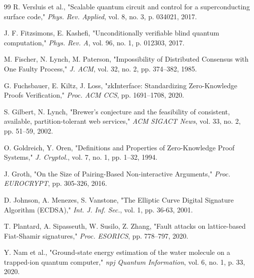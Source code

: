 \documentclass[preprint,12pt]{elsarticle}
\begin{document}
\begin{thebibliography}{99}
                R. Versluis et al., 
                "Scalable quantum circuit and control for a superconducting surface code," 
                \textit{Phys. Rev. Applied}, vol. 8, no. 3, p. 034021, 2017.

                J. F. Fitzsimons, E. Kashefi, 
                "Unconditionally verifiable blind quantum computation," 
                \textit{Phys. Rev. A}, vol. 96, no. 1, p. 012303, 2017.

                M. Fischer, N. Lynch, M. Paterson, 
                "Impossibility of Distributed Consensus with One Faulty Process," 
                \textit{J. ACM}, vol. 32, no. 2, pp. 374–382, 1985.

                G. Fuchsbauer, E. Kiltz, J. Loss, 
                "zkInterface: Standardizing Zero-Knowledge Proofs Verification," 
                \textit{Proc. ACM CCS}, pp. 1691–1708, 2020.

                S. Gilbert, N. Lynch, 
                "Brewer's conjecture and the feasibility of consistent, available, partition-tolerant web services," 
                \textit{ACM SIGACT News}, vol. 33, no. 2, pp. 51–59, 2002.

                O. Goldreich, Y. Oren, 
                "Definitions and Properties of Zero-Knowledge Proof Systems," 
                \textit{J. Cryptol.}, vol. 7, no. 1, pp. 1–32, 1994.

                J. Groth, 
                "On the Size of Pairing-Based Non-interactive Arguments," 
                \textit{Proc. EUROCRYPT}, pp. 305-326, 2016.

                D. Johnson, A. Menezes, S. Vanstone, 
                "The Elliptic Curve Digital Signature Algorithm (ECDSA)," 
                \textit{Int. J. Inf. Sec.}, vol. 1, pp. 36-63, 2001.

                T. Plantard, A. Sipasseuth, W. Susilo, Z. Zhang, 
                "Fault attacks on lattice-based Fiat-Shamir signatures," 
                \textit{Proc. ESORICS}, pp. 778–797, 2020.

                Y. Nam et al., 
                "Ground-state energy estimation of the water molecule on a trapped-ion quantum computer," 
                \textit{npj Quantum Information}, vol. 6, no. 1, p. 33, 2020.


\end{thebibliography}
\end{document}

